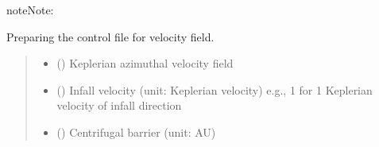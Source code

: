 \documentclass[a4paper,11pt,english]{sphinxmanual}
\begin{document}
\begin{fulllineitems}
\begin{fulllineitems}
\begin{quote}
\begin{description}
\end{description}\end{quote}

\begin{sphinxadmonition}{note}{Note:}\begin{description}
\sphinxAtStartPar
{}

\end{description}
\end{sphinxadmonition}

\end{fulllineitems}


\begin{fulllineitems}
\label{\detokenize{radmc3d:setup.radmc3d_setup.get_vfieldcontrol}}
\pysigstartsignatures
\pysiglinewithargsret
{}
{\sphinxparamcomma {}\sphinxparamcomma {}\sphinxparamcomma {}}
{}
\pysigstopsignatures
\sphinxAtStartPar
Preparing the control file for velocity field.
\begin{quote}\begin{description}
\begin{itemize}
\item {} 
\sphinxAtStartPar
{} () \textendash{} Keplerian azimuthal velocity field

\item {} 
\sphinxAtStartPar
{} () \textendash{} Infall velocity (unit: Keplerian velocity) e.g., 1 for 1 Keplerian velocity of infall direction

\item {} 
\sphinxAtStartPar
{} () \textendash{} Centrifugal barrier (unit: AU)


\end{itemize}
\end{description}
\end{quote}
\end{fulllineitems}
\end{fulllineitems}
\end{document}
